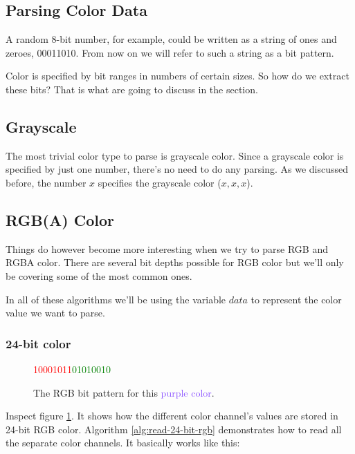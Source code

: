 \begin{refsection}
  \section{Parsing Color Data}
  \label{sec:parsing-color-data}

  A random 8-bit number, for example, could be written as a string of
  ones and zeroes, 00011010. From now on we will refer to such a
  string as a bit pattern.

  Color is specified by bit ranges in numbers of certain
  sizes. So how do we extract these bits? That is what are going to
  discuss in the section.

  \subsection{Grayscale}

  The most trivial color type to parse is grayscale color. Since a
  grayscale color is specified by just one number, there's no need to
  do any parsing. As we discussed before, the number $x$ specifies the
  grayscale color \mbox{($x,x,x$)}. 

  \subsection{RGB(A) Color}

  Things do however become more interesting when we try to parse RGB
  and RGBA color. There are several bit depths possible for RGB
  color but we'll only be covering some of the most common ones.

  In all of these algorithms we'll be using the variable $data$ to
  represent the color value we want to parse.

  \subsubsection{24-bit color}

  \begin{figure}
    \centering
    {\huge\textcolor{red}{10001011}\textcolor{green}{01010010}\textcolor{blue}{\fullbyte}}
    \label{fig:24-bit-colors-bits}
    \caption{The RGB bit pattern for this \textcolor[HTML]{8B52FF}{purple color}.}
  \end{figure}

  Inspect figure \ref{fig:24-bit-colors-bits}. It shows how the
  different color channel's values are stored in 24-bit RGB
  color. Algorithm \ref{alg:read-24-bit-rgb} demonstrates how to read
  all the separate color channels. It basically works like this:


\end{refsection}
